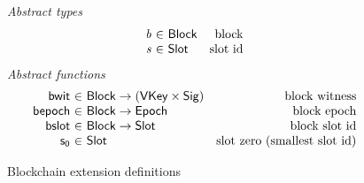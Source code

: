 \begin{figure}
  \emph{Abstract types}
  \begin{equation*}
    \begin{array}{r@{~\in~}lr}
      \var{b} & \Block & \text{block}\\
      \var{s} & \Slot & \text{slot id}\\
    \end{array}
  \end{equation*}
  \emph{Abstract functions}
  \begin{equation*}
    \begin{array}{r@{~\in~}lr}
    \fun{bwit} & \Block \to (\VKey \times \Sig) & \text{block witness}\\
      \fun{bepoch} & \Block \to \Epoch & \text{block epoch}\\
      \fun{bslot} & \Block \to \Slot & \text{block slot id}\\
    \fun{s_0} & \Slot  & \text{slot zero (smallest slot id)}\\
    \end{array}
  \end{equation*}
  \caption{Blockchain extension definitions}
  \label{fig:defs:chain-extension}
\end{figure}

